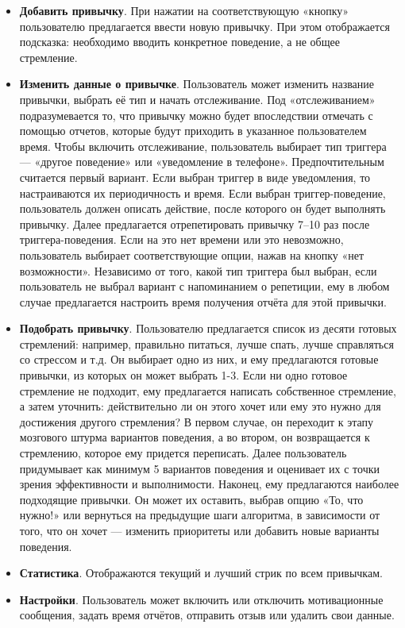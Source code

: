 \documentclass[pdflatex,sn-mathphys-num]{sn-jnl}%
\theoremstyle{thmstyleone}%
\theoremstyle{thmstyletwo}%
\theoremstyle{thmstylethree}%
\begin{document}
\begin{itemize}
    \item \textbf{Добавить привычку}. При нажатии на соответствующую «кнопку» пользователю предлагается ввести новую привычку. При этом отображается подсказка: необходимо вводить конкретное поведение, а не общее стремление.
    \item \textbf{Изменить данные о привычке}. Пользователь может изменить название привычки, выбрать её тип и начать отслеживание. Под «отслеживанием» подразумевается то, что привычку можно будет впоследствии отмечать с помощью отчетов, которые будут приходить в указанное пользователем время. Чтобы включить отслеживание, пользователь выбирает тип триггера — «другое поведение» или «уведомление в телефоне». Предпочтительным считается первый вариант. Если выбран триггер в виде уведомления, то настраиваются их периодичность и время. Если выбран триггер-поведение, пользователь должен описать действие, после которого он будет выполнять привычку. Далее предлагается отрепетировать привычку 7–10 раз после триггера-поведения. Если на это нет времени или это невозможно, пользователь выбирает соответствующие опции, нажав на кнопку «нет возможности». Независимо от того, какой тип триггера был выбран, если пользователь не выбрал вариант с напоминанием о репетиции, ему в любом случае предлагается настроить время получения отчёта для этой привычки.
    \item \textbf{Подобрать привычку}. Пользователю предлагается список из десяти готовых стремлений: например, правильно питаться, лучше спать, лучше справляться со стрессом и т.д. Он выбирает одно из них, и ему предлагаются готовые привычки, из которых он может выбрать 1-3. Если ни одно готовое стремление не подходит, ему предлагается написать собственное стремление, а затем уточнить: действительно ли он этого хочет или ему это нужно для достижения другого стремления? В первом случае, он переходит к этапу мозгового штурма вариантов поведения, а во втором, он возвращается к стремлению, которое ему придется переписать. Далее пользователь придумывает как минимум 5 вариантов поведения и оценивает их с точки зрения эффективности и выполнимости. Наконец, ему предлагаются наиболее подходящие привычки. Он может их оставить, выбрав опцию «То, что нужно!» или вернуться на предыдущие шаги алгоритма, в зависимости от того, что он хочет — изменить приоритеты или добавить новые варианты поведения.
    \item \textbf{Статистика}. Отображаются текущий и лучший стрик по всем привычкам.
    \item \textbf{Настройки}. Пользователь может включить или отключить мотивационные сообщения, задать время отчётов, отправить отзыв или удалить свои данные.
\end{itemize}
\end{document}
